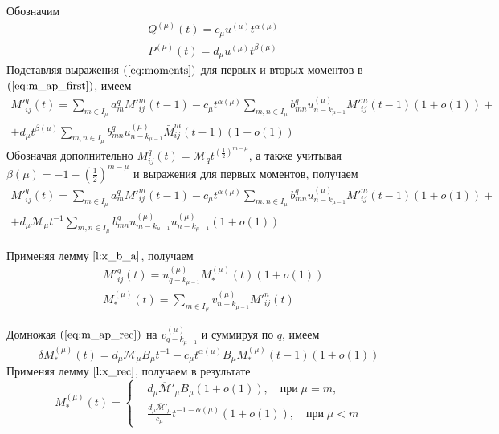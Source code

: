 \documentclass[11pt]{article}
\begin{document}
Обозначим
\begin{equation}
    \begin{split}
        &Q^{(\mu)}(t) = c_\mu u^{(\mu)} t^{\alpha(\mu)} \\
        &P^{(\mu)}(t) = d_\mu u^{(\mu)} t^{\beta(\mu)}
    \end{split}
\end{equation}
Подставляя выражения $(\ref{eq:moments})$ для первых и вторых моментов в $(\ref{eq:m_ap_first})$, имеем
\begin{multline}
    M'^q_{ij}(t) = \sum_{m \in I_\mu} a^q_m M'^m_{ij}(t-1) - c_\mu t^{\alpha(\mu)} \sum_{m,n \in I_\mu} b^q_{mn} u^{(\mu)}_{n - k_{\mu-1}} M'^m_{ij}(t-1) (1 + o(1)) + \\
    + d_\mu t^{\beta(\mu)} \sum_{m,n \in I_\mu} b^q_{mn} u^{(\mu)}_{n - k_{\mu-1}} \bar{M}^m_{ij}(t-1) (1 + o(1))
\end{multline}
Обозначая дополнительно $M^q_{ij}(t) = \mathcal{M}_q t^{\left( \frac{1}{2} \right)^{m - \mu}}$, а также учитывая $\beta(\mu) = -1 -\left( \frac{1}{2} \right)^{m - \mu}$ и выражения для первых моментов, получаем
\begin{multline}
\label{eq:m_ap_rec}
    M'^q_{ij}(t) = \sum_{m \in I_\mu} a^q_m M'^m_{ij}(t-1) - c_\mu t^{\alpha(\mu)} \sum_{m,n \in I_\mu} b^q_{mn} u^{(\mu)}_{n - k_{\mu-1}} M'^m_{ij}(t-1) (1 + o(1)) + \\
    + d_\mu \mathcal{M}_\mu t^{-1} \sum_{m,n \in I_\mu} b^q_{mn} u^{(\mu)}_{m - k_{\mu - 1}} u^{(\mu)}_{n - k_{\mu-1}} (1 + o(1))
\end{multline}

Применяя лемму $\ref{l:x_b_a}$, получаем
\begin{equation}
    \begin{split}
        &M'^q_{ij}(t) = u^{(\mu)}_{q - k_{\mu-1}} M^{(\mu)}_*(t) (1 + o(1)) \\
        &M^{(\mu)}_*(t) = \sum_{m \in I_\mu} v^{(\mu)}_{n - k_{\mu-1}} M'^n_{ij}(t)
    \end{split}
\end{equation}

Домножая $(\ref{eq:m_ap_rec})$ на $v^{(\mu)}_{q - k_{\mu-1}}$ и суммируя по $q$, имеем
\begin{equation}
    \delta M^{(\mu)}_*(t) = d_\mu \mathcal{M}_\mu B_\mu t^{-1} - c_\mu t^{\alpha(\mu)} B_\mu M^{(\mu)}_*(t-1) (1 + o(1))
\end{equation}
Применяя лемму $\ref{l:x_rec}$, получаем в результате
\begin{equation}
\label{eq:m_star_result_1}
    M^{(\mu)}_*(t) = \left\{
    \begin{split}
        &d_\mu \overline{\mathcal{M}}'_\mu B_\mu (1 + o(1)),\quad{}\text{при}\;\mu = m, \\
        &\frac{ d_\mu \overline{\mathcal{M}}'_\mu }{ c_\mu } t^{-1 -\alpha(\mu)} (1 + o(1)),\quad{}\text{при}\;\mu < m
    \end{split}
    \right.
\end{equation}
\end{document}
